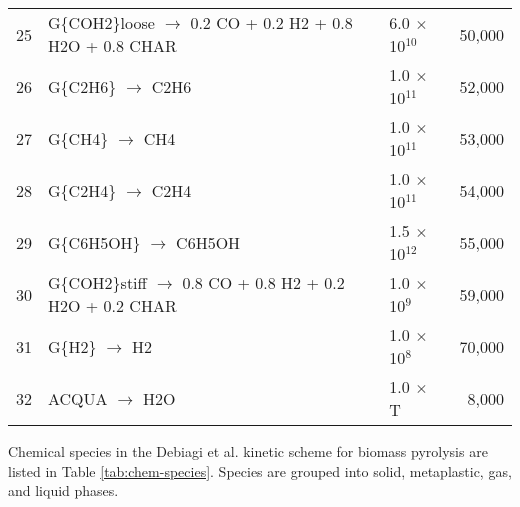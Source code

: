 \begin{center}
\begin{longtable}{cp{4in}lr}
        25 & G\{COH2\}loose $\rightarrow$ 0.2 CO + 0.2 H2 + 0.8 H2O + 0.8 CHAR & 6.0 $\times$ 10$^{10}$ & 50,000 \\
        26 & G\{C2H6\} $\rightarrow$ C2H6 & 1.0 $\times$ 10$^{11}$ & 52,000 \\
        27 & G\{CH4\} $\rightarrow$ CH4 & 1.0 $\times$ 10$^{11}$ & 53,000 \\
        28 & G\{C2H4\} $\rightarrow$ C2H4 & 1.0 $\times$ 10$^{11}$ & 54,000 \\
        29 & G\{C6H5OH\} $\rightarrow$ C6H5OH & 1.5 $\times$ 10$^{12}$ & 55,000 \\
        30 & G\{COH2\}stiff $\rightarrow$ 0.8 CO + 0.8 H2 + 0.2 H2O + 0.2 CHAR & 1.0 $\times$ 10$^9$ & 59,000 \\
        31 & G\{H2\} $\rightarrow$ H2 & 1.0 $\times$ 10$^8$ & 70,000 \\
        32 & ACQUA $\rightarrow$ H2O & 1.0 $\times$ T & 8,000 \\
        \bottomrule
    \end{longtable}
\end{center}

Chemical species in the Debiagi et al. kinetic scheme for biomass pyrolysis are listed in Table \ref{tab:chem-species}. Species are grouped into solid, metaplastic, gas, and liquid phases.

